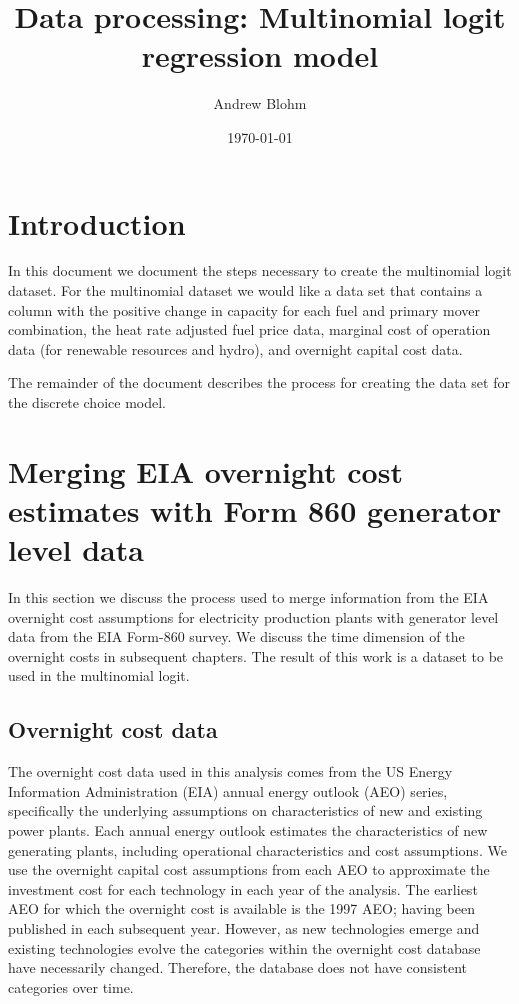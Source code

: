 \documentclass[10pt]{report}
\title{Data processing: Multinomial logit regression model}
\author{Andrew Blohm}
\date{\today}
\begin{document}
\maketitle

\chapter{Introduction}
In this document we document the steps necessary to create the multinomial logit dataset. 
For the multinomial dataset we would like a data set that contains a column with the positive change in capacity for each fuel and primary mover combination, the heat rate adjusted fuel price data, marginal cost of operation data (for renewable resources and hydro), and overnight capital cost data. 

The remainder of the document describes the process for creating the data set for the discrete choice model.


\chapter{Merging EIA overnight cost estimates with Form 860 generator level data}
In this section we discuss the process used to merge information from the EIA overnight cost assumptions for electricity production plants with generator level data from the EIA Form-860 survey.  
We discuss the time dimension of the overnight costs in subsequent chapters. 
The result of this work is a dataset to be used in the multinomial logit.

\section{Overnight cost data}
The overnight cost data used in this analysis comes from the US Energy Information Administration (EIA) annual energy outlook (AEO) series, specifically the underlying assumptions on characteristics of new and existing power plants. 
Each annual energy outlook estimates the characteristics of new generating plants, including operational characteristics and cost assumptions.
We use the overnight capital cost assumptions from each AEO to approximate the investment cost for each technology in each year of the analysis.
The earliest AEO for which the overnight cost is available is the 1997 AEO; having been published in each subsequent year.
However, as new technologies emerge and existing technologies evolve the categories within the overnight cost database have necessarily changed. 
Therefore, the database does not have consistent categories over time. 
\end{document}
